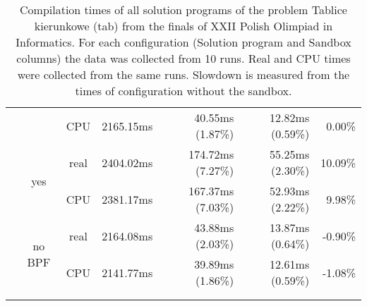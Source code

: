 \documentclass[en]{pracamgr}
\begin{document}
\begin{appendices}
\begin{small}
\begin{longtable}{|l|c|c|r|r|r|r|}
                            &                         & CPU  & 2165.15ms & 40.55ms (1.87\%) & 12.82ms (0.59\%) & 0.00\% \\*
                            \cline{2-7}
                            & \multirow{2}{*}{yes}    & real & 2404.02ms & 174.72ms (7.27\%) & 55.25ms (2.30\%) & 10.09\% \\*
                            &                         & CPU  & 2381.17ms & 167.37ms (7.03\%) & 52.93ms (2.22\%) & 9.98\% \\*
                            \cline{2-7}
                            & \multirow{2}{*}{no BPF} & real & 2164.08ms & 43.88ms (2.03\%) & 13.87ms (0.64\%) & -0.90\% \\*
                            &                         & CPU  & 2141.77ms & 39.89ms (1.86\%) & 12.61ms (0.59\%) & -1.08\% \\
\hline
\multicolumn{1}{c}{}\\ %
\caption{Compilation times of all solution programs of the problem Tablice kierunkowe (tab) from the finals of XXII Polish Olimpiad in Informatics. For each configuration (Solution program and Sandbox columns) the data was collected from 10 runs. Real and CPU times were collected from the same runs. Slowdown is measured from the times of configuration without the sandbox.}
\label{table:tab_compilation}
\end{longtable}
\end{small}


\end{appendices}
\end{document}
